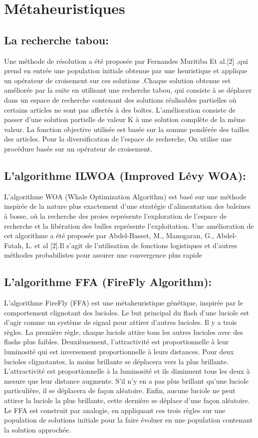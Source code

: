 \documentclass[class=report, crop=false]{standalone}
\begin{document}
        \section{Métaheuristiques}
        \subsection{La recherche tabou: }
        Une méthode de résolution a été proposée par Fernandes Muritiba Et al.[2] ,qui prend en entrée une population initiale obtenue par une heuristique et applique un opérateur de croisement sur ces solutions .Chaque solution obtenue est améliorée par la suite en utilisant une recherche tabou, qui consiste à  se déplacer dans un espace de recherche contenant des solutions réalisables  partielles où certains articles ne sont pas affectés à des boîtes. L’amélioration consiste de passer d’une solution partielle de valeur K à une solution complète de la même valeur. La fonction objective utilisée est basée sur la somme pondérée des tailles des articles.
Pour la diversification de l’espace de recherche, On utilise une procédure basée sur un opérateur de croisement.
        \subsection{L’algorithme ILWOA (Improved Lévy WOA): }
        L’algorithme WOA (Whale Optimization Algorithm) est basé sur une méthode inspirée de la nature plus exactement d’une stratégie d’alimentation des baleines à bosse, où la recherche des proies représente l’exploration de l’espace de recherche et la libération des bulles représente l’exploitation.
Une amélioration de cet algorithme a été proposée par Abdel-Basset, M., Manogaran, G., Abdel-Fatah, L. et al [2].Il s’agit de l’utilisation de fonctions logistiques et d’autres méthodes probabilistes pour assurer une convergence plus rapide
        \subsection{L’algorithme FFA (FireFly Algorithm): }
        L'algorithme FireFly (FFA) est une métaheuristique génétique, inspirée par le comportement clignotant des lucioles. Le but principal du flash d'une luciole est d'agir comme un système de signal pour attirer d'autres lucioles. Il y a trois règles. La première règle, chaque luciole attire tous les autres lucioles avec des flashs plus faibles. Deuxièmement, l'attractivité est proportionnelle à leur luminosité qui est inversement proportionnelle à leurs distances. Pour deux lucioles clignotantes, la moins brillante se déplacera vers la plus brillante. L'attractivité est proportionnelle à la luminosité et ils diminuent tous les deux à mesure que leur distance augmente. S'il n'y en a pas plus brillant qu'une luciole particulière, il se déplacera de façon aléatoire. Enfin, aucune luciole ne peut attirer la luciole la plus brillante, cette dernière se déplace d’une façon aléatoire. Le FFA est construit par analogie, en appliquant ces trois règles sur une population de solutions initiale pour la faire évoluer en une population contenant la solution approchée.
\end{document}
